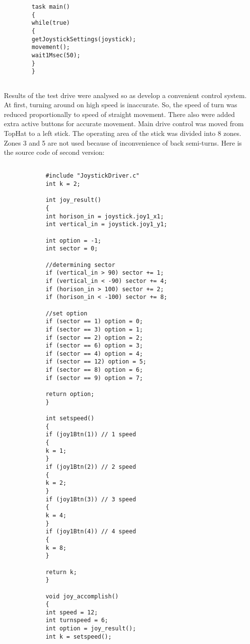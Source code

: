 \begin{enumerate*}
{\begin{verbatim}
	    task main()
	    {
	    while(true)
	    {
	    getJoystickSettings(joystick);
	    movement();
	    wait1Msec(50);
	    }
	    }
	    
	    \end{verbatim} 
	    }
	    \item Results of the test drive were analysed so as develop a convenient control system. At first, turning around on high speed is inaccurate. So, the speed of turn was reduced proportionally to speed of straight movement. There also were added extra active buttons for accurate movement. Main drive control was moved from TopHat to a left stick. The operating area of the stick was divided into 8 zones. Zones 3 and 5 %
	    are not used because of inconvenience of back semi-turns. \newline
	    Here is the source code of second version: \newline
	    {\small
	    	\begin{verbatim}
	    	
	    	#include "JoystickDriver.c"
	    	int k = 2;
	    	
	    	int joy_result()
	    	{
	    	int horison_in = joystick.joy1_x1;
	    	int vertical_in = joystick.joy1_y1;
	    	
	    	int option = -1;
	    	int sector = 0;
	    	
	    	//determining sector
	    	if (vertical_in > 90) sector += 1;
	    	if (vertical_in < -90) sector += 4;
	    	if (horison_in > 100) sector += 2;
	    	if (horison_in < -100) sector += 8;
	    	
	    	//set option  
	    	if (sector == 1) option = 0;
	    	if (sector == 3) option = 1;
	    	if (sector == 2) option = 2;
	    	if (sector == 6) option = 3;
	    	if (sector == 4) option = 4;
	    	if (sector == 12) option = 5;
	    	if (sector == 8) option = 6;
	    	if (sector == 9) option = 7;
	    	
	    	return option;
	    	}
	    	
	    	int setspeed()
	    	{
	    	if (joy1Btn(1))	// 1 speed
	    	{
	    	k = 1;
	    	}
	    	if (joy1Btn(2))	// 2 speed
	    	{
	    	k = 2;
	    	}
	    	if (joy1Btn(3))	// 3 speed
	    	{
	    	k = 4;
	    	}
	    	if (joy1Btn(4))	// 4 speed
	    	{
	    	k = 8;
	    	}
	    	
	    	return k;
	    	}
	    	
	    	void joy_accomplish()
	    	{
	    	int speed = 12;
	    	int turnspeed = 6;
	    	int option = joy_result();
	    	int k = setspeed();
	    	

\end{verbatim}}
\end{enumerate*}
